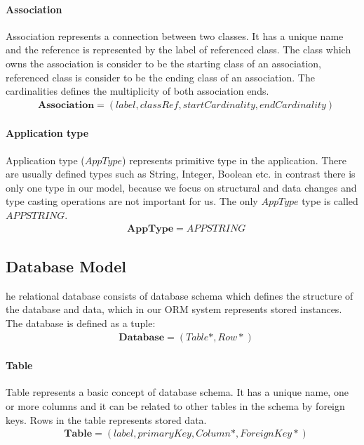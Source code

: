 \documentclass[11pt]{article}
\begin{document}
\paragraph {Association} Association represents a connection between two classes. It has a unique name and the reference is represented by the label of referenced class. The class which owns the association is consider to be the starting class of an association, referenced class is consider to be the ending class of an association. The cardinalities defines the multiplicity of both association ends.
\begin{align*}
&	\mathbf{Association} = (label, classRef, startCardinality, endCardinality) 
\end{align*}

\paragraph{Application type} Application type ($AppType$) represents primitive type in the application. There are usually defined types such as String, Integer, Boolean etc. in contrast there is only one type in our model, because we focus on structural and data changes and type casting operations are not important for us. The only $AppType$ type is called $APPSTRING$.
\begin{align*}
& \mathbf{AppType} = APPSTRING
\end{align*}


\subsection{Database Model}
he relational database consists of database schema which defines the structure of the database and data, which in our ORM system represents stored instances. The database is defined as a tuple:
\begin{align*}
&	\mathbf{Database} = ( Table*, Row* )
\end{align*}

\paragraph{Table} Table represents a basic concept of database schema. It has a unique name, one or more columns and it can be related to other tables in the schema by foreign keys. Rows in the table represents stored data.
\begin{align*}
&	\mathbf{Table} = (label, primaryKey, Column*, ForeignKey*)
\end{align*}
\end{document}
